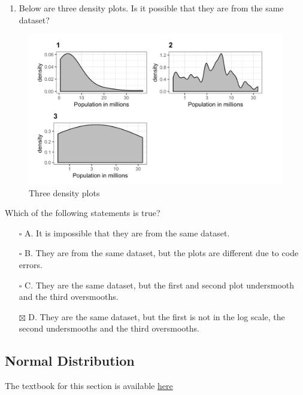\documentclass[
]{article}
\providecommand{\tightlist}{%
  \setlength{\itemsep}{0pt}\setlength{\parskip}{0pt}}
\begin{document}
\begin{enumerate}
\def\labelenumi{\arabic{enumi}.}
\setcounter{enumi}{9}
\tightlist
\item
  Below are three density plots. Is it possible that they are from the
  same dataset?
\end{enumerate}

\begin{figure}
\centering
\includegraphics{images/Three density plots.png}
\caption{Three density plots}
\end{figure}

Which of the following statements is true?

\begin{itemize}
\tightlist
\item[$\square$]
  A. It is impossible that they are from the same dataset.
\item[$\square$]
  B. They are from the same dataset, but the plots are different due to
  code errors.
\item[$\square$]
  C. They are the same dataset, but the first and second plot
  undersmooth and the third oversmooths.
\item[$\boxtimes$]
  D. They are the same dataset, but the first is not in the log scale,
  the second undersmooths and the third oversmooths.
\end{itemize}

\newpage

\hypertarget{normal-distribution}{%
\subsection{Normal Distribution}\label{normal-distribution}}

The textbook for this section is available
\href{https://rafalab.github.io/dsbook/distributions.html\#normal-distribution}{here}
\end{document}
